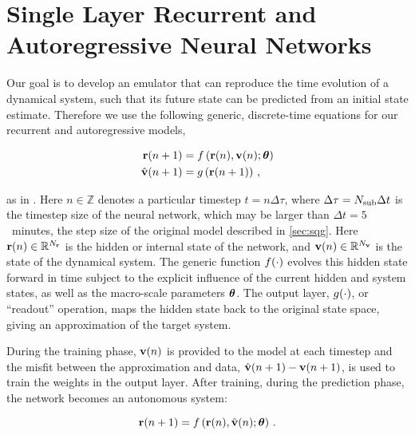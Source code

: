 \section{Single Layer Recurrent and Autoregressive Neural Networks}
\label{sec:rnn-architecture}

Our goal is to develop an emulator that can reproduce the time evolution of a
dynamical system, such that its future state can be predicted from an initial
state estimate.
Therefore we use the following generic, discrete-time equations for our
recurrent and autoregressive models,
\begin{linenomath*}\begin{equation}
    \begin{aligned}
        \mathbf{r}(n+1) &= f\left(
            \mathbf{r}(n), \mathbf{v}(n); \bm{\theta}
            \right) \\
        \hat{\mathbf{v}}(n+1) &= g \left( \mathbf{r}(n+1) \right) \, ,
    \end{aligned}
    \label{eq:rnn}
\end{equation}\end{linenomath*}
as in \citet{goodfellow_sequence_2016}.
Here $n\in\mathbb{Z}$ denotes a particular timestep $t = n\Delta \tau$,
where $\Delta\tau = N_\text{sub}\Delta t$ is the timestep size of the neural network,
which may be larger than $\Delta t=5$~minutes, the step size of the original model described in
\cref{sec:sqg}.
Here
$\mathbf{r}(n)\in\mathbb{R}^{N_{\mathbf{r}}}$ is the hidden or internal state of the network,
and
$\mathbf{v}(n)\in\mathbb{R}^{N_{\mathbf{v}}}$ is the state of the dynamical system.
The generic function $f(\cdot)$ evolves this hidden state forward in
time subject to the explicit
influence of the current hidden and system states, as well as the macro-scale
parameters $\bm{\theta}$.
The output layer,
$g(\cdot)$, or ``readout'' operation,
maps the hidden state back to the original state space, giving an
approximation of the target system.

During the training phase, $\mathbf{v}(n)$ is provided to the model at each timestep
and the misfit between the approximation and data,
$\hat{\mathbf{v}}(n+1) - \mathbf{v}(n+1)$, is used to train the weights in the output
layer.
After training, during the prediction phase, the network becomes an autonomous
system:
\begin{linenomath*}\begin{equation*}
    \mathbf{r}(n+1) = f\left(
        \mathbf{r}(n), \hat{\mathbf{v}}(n); \bm{\theta}\right) \, .
\end{equation*}\end{linenomath*}

